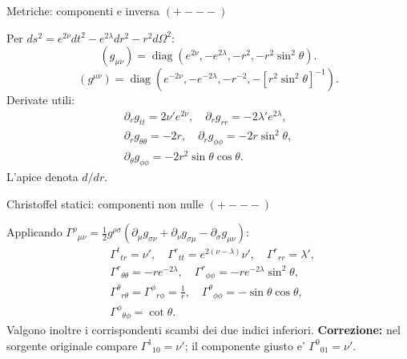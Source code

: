 \begin{frame}[t]{Metriche: componenti e inversa $(+---)$}\small\raggedright

Per $ds^2=e^{2\nu}dt^2-e^{2\lambda}dr^2-r^2d\Omega^2$:
\[
(g_{\mu\nu})=\operatorname{diag}
(e^{2\nu},-e^{2\lambda},-r^2,-r^2\sin^2\theta).
\]
\[
(g^{\mu\nu})=\operatorname{diag}
(e^{-2\nu},-e^{-2\lambda},-r^{-2},-[r^2\sin^2\theta]^{-1}).
\]
Derivate utili:
\[
\begin{gathered}
\partial_rg_{tt}=2\nu'e^{2\nu},\quad
\partial_rg_{rr}=-2\lambda'e^{2\lambda},\\
\partial_rg_{\theta\theta}=-2r,\quad
\partial_rg_{\phi\phi}=-2r\sin^2\theta,\\
\partial_\theta g_{\phi\phi}=-2r^2\sin\theta\cos\theta.
\end{gathered}
\]
L'apice denota $d/dr$.

\end{frame}

\begin{frame}[t]{Christoffel statici: componenti non nulle $(+---)$}\small\raggedright

Applicando $\Gamma^\rho{}_{\mu\nu}=\tfrac12g^{\rho\sigma}(\partial_\mu g_{\sigma\nu}+\partial_\nu g_{\sigma\mu}-\partial_\sigma g_{\mu\nu})$:
\[
\begin{aligned}
&\Gamma^t{}_{tr}=\nu',\quad
\Gamma^r{}_{tt}=e^{2(\nu-\lambda)}\nu',\quad
\Gamma^r{}_{rr}=\lambda',\\
&\Gamma^r{}_{\theta\theta}=-re^{-2\lambda},\quad
\Gamma^r{}_{\phi\phi}=-re^{-2\lambda}\sin^2\theta,\\
&\Gamma^\theta{}_{r\theta}=\Gamma^\phi{}_{r\phi}=\frac1r,\quad
\Gamma^\theta{}_{\phi\phi}=-\sin\theta\cos\theta,\\
&\Gamma^\phi{}_{\theta\phi}=\cot\theta.
\end{aligned}
\]
Valgono inoltre i corrispondenti scambi dei due indici inferiori.
\medskip
\textbf{Correzione:} nel sorgente originale compare $\Gamma^1{}_{10}=\nu'$; il componente giusto e' $\Gamma^0{}_{01}=\nu'$.

\end{frame}

